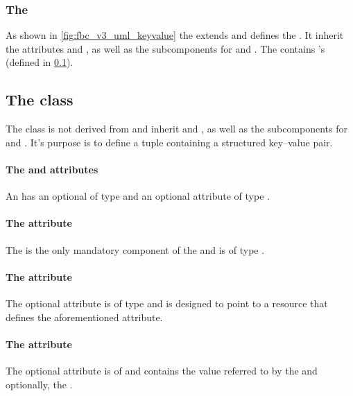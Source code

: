 \subsubsection{The \FBC {}}
\label{listofkeyvalues-class}
As shown in \ref{fig:fbc_v3_uml_keyvalue} the \ListOfKeyValues extends \SBase and defines the . It  inherit the
attributes  and , as well as the subcomponents for \Annotation and \Notes. The \ListOfKeyValues contains \KeyValue's (defined in \ref{keyvalue-class}).

\subsection{The \FBC {} class}
\label{keyvalue-class}

The \FBC \KeyValue class is not derived from \SBML \SBase and  inherit
 and , as well as the subcomponents for
\Annotation and \Notes. It's purpose is to define a tuple containing a
structured key--value pair.

\paragraph{The  and  attributes}
An \UserConstraint has an optional  of type
 and an optional attribute  of type .

\paragraph{The  attribute}
The  is the only mandatory component of the \KeyValue and is of type .

\paragraph{The  attribute}
The optional attribute  is of type  and is designed to point to a resource that defines the aforementioned  attribute.

\paragraph{The  attribute}
The optional  attribute is of  and contains the value referred to by the  and optionally, the . 